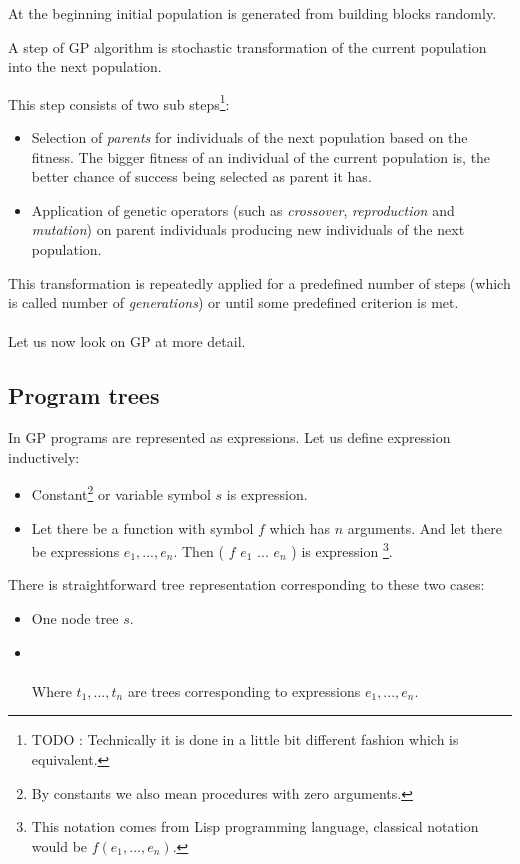 \documentclass[12pt,a4paper]{report}
\newcommand{\Lets}{Let us }
\begin{document}
At the beginning initial population is generated from building blocks randomly.

A step of GP algorithm is stochastic transformation of the current population into 	
the next population.

This step consists of two sub steps\footnote{TODO : Technically it is done in a little  
bit different fashion which is equivalent.}:
\begin{itemize} 
	\item Selection of \textit{parents} for individuals of the next population based on the fitness.
	      The bigger fitness of an individual of the current population is, 
	      the better chance of success being selected as parent it has.  
	\item Application of genetic operators (such as \textit{crossover}, 
	      \textit{reproduction} and \textit{mutation}) 
		  on parent individuals producing new individuals of the next population.  
\end{itemize}	  
This transformation is repeatedly applied for a predefined number of steps (which is called 
number of \textit{generations}) or until some predefined criterion is met.	
\\\\
\Lets now look on GP at more detail. 


\subsection{Program trees}

In GP programs are represented as expressions. \Lets define expression inductively:

\begin{itemize}
	\item Constant\footnote{By constants we also mean procedures with zero  	
		  arguments.} or variable symbol $s$ is expression.
	\item Let there be a function with symbol $f$ which has $n$ arguments. 
	      And let there be expressions $e_{1}, ..., e_{n}$. 
	      Then ( $f$ $e_{1}$ ... $e_{n}$ ) is expression
	      \footnote{This notation comes from Lisp programming language, 
	      classical notation would be $f(e_{1}, ... ,e_{n})$. }.   
\end{itemize}

There is straightforward tree representation corresponding to these two cases:

\begin{itemize}
	\item One node tree $s$.
    \item {}\\\\
		 Where $t_{1}, ..., t_{n}$ are trees corresponding to expressions $e_{1}, ..., e_{n}$.	   
\end{itemize}
\end{document}
